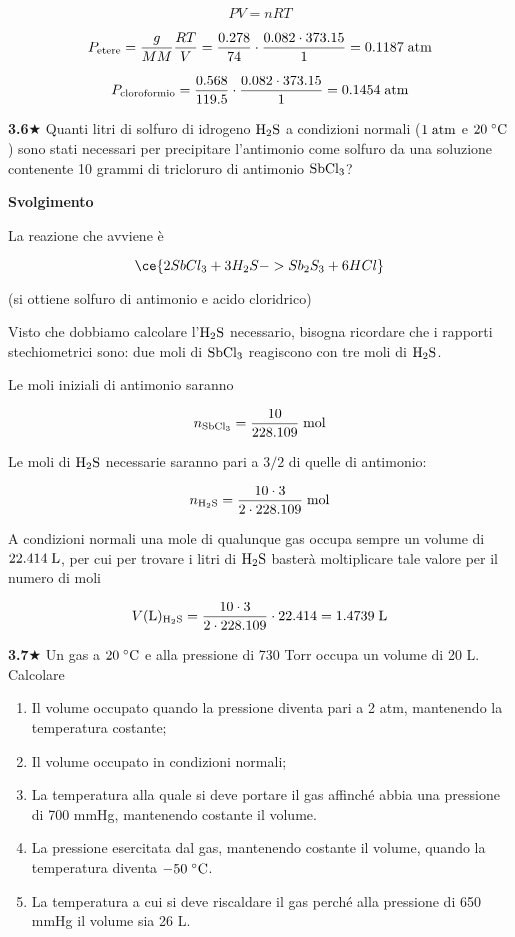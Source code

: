 $$PV=nRT$$

$$P_{\rm etere}
=\frac{g}{MM}\frac{RT}{V}
=\frac{0.278}{74}\cdot\frac{0.082 \cdot 373.15}{1}
=0.1187 \; \rm atm$$

$$P_{\rm cloroformio}
=\frac{0.568}{119.5}\cdot\frac{0.082 \cdot 373.15}{1}
=0.1454 \; \rm atm$$

\vspace{0.2cm}\textbf{3.6}$\bigstar$ Quanti litri di solfuro di idrogeno $\rm H_2S$ a condizioni normali ($1 \; \rm atm$ e $20 \; ^{\circ}\rm C$) sono stati necessari per precipitare l'antimonio come solfuro da una soluzione contenente 10 grammi di tricloruro di antimonio $\rm SbCl_3$?

\vspace{0.2cm}\large\textbf{Svolgimento}\normalsize

\vspace{0.2cm}La reazione che avviene è

$$\ce{2SbCl_3 + 3H_2S -> Sb_2S_3 + 6HCl}$$

(si ottiene solfuro di antimonio e acido cloridrico)

Visto che dobbiamo calcolare l'$\rm H_2S$ necessario, bisogna ricordare che i rapporti stechiometrici sono: due moli di $\rm SbCl_3$ reagiscono con tre moli di $\rm H_2S$.

Le moli iniziali di antimonio saranno

$$n_{\rm SbCl_3}=\frac{10}{228.109} \; \rm mol$$

Le moli di $\rm H_2S$ necessarie saranno pari a $3/2$ di quelle di antimonio:

$$n_{\rm H_2S}=\frac{10 \cdot 3}{2 \cdot 228.109} \; \rm mol$$

A condizioni normali una mole di qualunque gas occupa sempre un volume di $22.414 \; \rm L$, per cui per trovare i litri di $\rm H_2S$ basterà moltiplicare tale valore per il numero di moli

$$V(\text{L})_{\rm H_2S}
=\frac{10 \cdot 3}{2 \cdot 228.109} \cdot 22.414
=1.4739 \; \rm L$$

\vspace{0.2cm}\textbf{3.7}$\bigstar$ Un gas a $20 \; ^{\circ} \rm C$ e alla pressione di 730 Torr occupa un volume di 20 L. Calcolare

\begin{enumerate}
    \item Il volume occupato quando la pressione diventa pari a 2 atm, mantenendo la temperatura costante;
    \item Il volume occupato in condizioni normali;
    \item La temperatura alla quale si deve portare il gas affinché abbia una pressione di 700 mmHg, mantenendo costante il volume.
    \item La pressione esercitata dal gas, mantenendo costante il volume, quando la temperatura diventa $-50 \; ^{\circ} \rm C$.
    \item La temperatura a cui si deve riscaldare il gas perché alla pressione di 650 mmHg il volume sia 26 L.
\end{enumerate}

